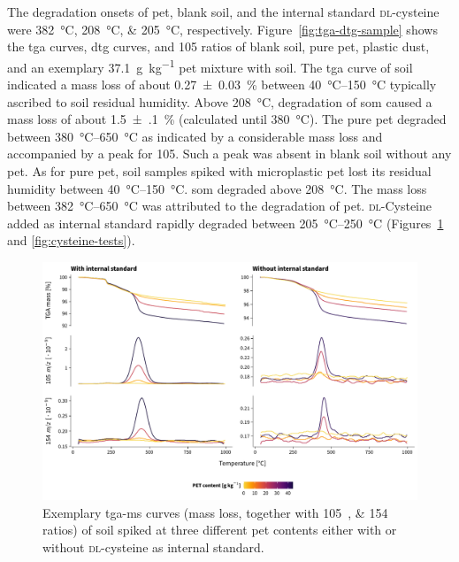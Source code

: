 The degradation onsets of \ac{pet}, blank soil, and the internal standard \textsc{dl}-cysteine were \SIlist{382;208;205}{\degreeCelsius}, respectively. Figure~\ref{fig:tga-dtg-sample} shows the \ac{tga} curves, \acf{dtg} curves, and \SI{105}{\mz} ratios of blank soil, pure \ac{pet}, plastic dust, and an exemplary \SI{37.1}{\gram\per\kilo\gram} \ac{pet} mixture with soil. The \ac{tga} curve of soil indicated a mass loss of about \SI{0.27(3)}{\percent} between \SIrange[range-phrase = { and }]{40}{150}{\degreeCelsius} typically ascribed to soil residual humidity.
Above \SI{208}{\degreeCelsius}, degradation of \ac{som} caused a mass loss of about \SI{1.5(1)}{\percent} (calculated until \SI{380}{\degreeCelsius}). The pure \ac{pet} degraded between \SIrange[range-phrase = { and }]{380}{650}{\degreeCelsius} as indicated by a considerable mass loss and accompanied by a peak for \SI{105}{\mz}.
Such a peak was absent in blank soil without any \ac{pet}. As for pure \ac{pet}, soil samples spiked with microplastic \ac{pet} lost its residual humidity between \SIrange[range-phrase = { and }]{40}{150}{\degreeCelsius}.
\Ac{som} degraded above \SI{208}{\degreeCelsius}. The mass loss between \SIrange[range-phrase = { and }]{382}{650}{\degreeCelsius} was attributed to the degradation of \ac{pet}. \textsc{dl}-Cysteine added as internal standard rapidly degraded between \SIrange[range-phrase = { and }]{205}{250}{\degreeCelsius} (Figures~\ref{fig:tga-ms} and \ref{fig:cysteine-tests}).

\begin{figure}
	\includegraphics[width=\textwidth]{figures/tga-ms}
	\caption[Exemplary \ac{tga-ms} curves of soil spiked at three different \ac{pet} contents with or without internal standard.]{Exemplary \ac{tga-ms} curves (mass loss, together with \SIlist{105;154}{\mz} ratios) of soil spiked at three different \ac{pet} contents either with or without \textsc{dl}-cysteine as internal standard.}
	\label{fig:tga-ms}
	\forcerectofloat
\end{figure}

